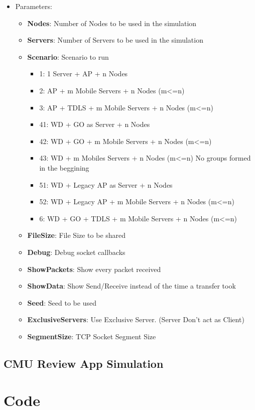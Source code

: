 \documentclass[a4paper]{book}
\begin{document}
\begin{itemize}
	\item[] Parameters:
	\begin{itemize}
		\item[] \textbf{Nodes}: Number of Nodes to be used in the simulation
		\item[] \textbf{Servers}: Number of Servers to be used in the simulation
		\item[] \textbf{Scenario}: Scenario to run
		\begin{itemize}
			\item 1: 1 Server + AP + n Nodes
			\item 2: AP + m Mobile Servers + n Nodes (m<=n)
			\item 3: AP + TDLS + m Mobile Servers + n Nodes (m<=n)
			\item 41: WD + GO as Server + n Nodes
			\item 42: WD + GO + m Mobile Servers + n Nodes (m<=n)
			\item 43: WD + m Mobiles Servers + n Nodes (m<=n) No groups formed in the beggining
			\item 51: WD + Legacy AP as Server + n Nodes
			\item 52: WD + Legacy AP + m Mobile Servers + n Nodes (m<=n)
			\item 6: WD + GO + TDLS + m Mobile Servers + n Nodes (m<=n)
		\end{itemize}
		\item[] \textbf{FileSize}: File Size to be shared
		\item[] \textbf{Debug}: Debug socket callbacks
		\item[] \textbf{ShowPackets}: Show every packet received
		\item[] \textbf{ShowData}: Show Send/Receive instead of the time a transfer took
		\item[] \textbf{Seed}: Seed to be used
		\item[] \textbf{ExclusiveServers}: Use Exclusive Server. (Server Don't act as Client)
		\item[] \textbf{SegmentSize}: TCP Socket Segment Size
	\end{itemize}
\end{itemize}	

\section{CMU Review App Simulation}


\chapter{Code}
\end{document}
